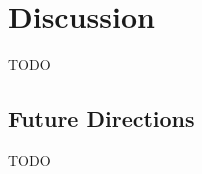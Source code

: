 \section{Discussion}
\label{sec:discussion}

TODO


\subsection{Future Directions}
\label{subsec:discussion:duture-directions}

TODO




